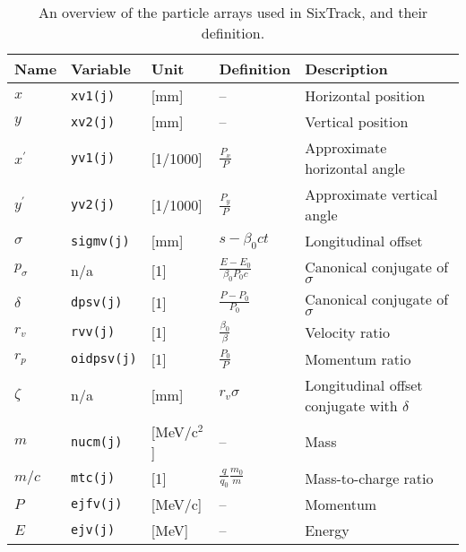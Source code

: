 \begin{center}
\begin{longtabu}{@{}llllp{7cm}}
  \caption{An overview of the particle arrays used in SixTrack, and their definition.}
  \label{Table:TrackArray} \\*
  \textbf{Name} & \textbf{Variable} & \textbf{Unit} & \textbf{Definition} & \textbf{Description} \\
  \hline
  $x$        & \texttt{xv1(j)}    & [mm]         & --                            & Horizontal position \\
  $y$        & \texttt{xv2(j)}    & [mm]         & --                            & Vertical position \\
  $x^\prime$ & \texttt{yv1(j)}    & [1/1000]     & $\frac{P_x}{P}$               & Approximate horizontal angle \\
  $y^\prime$ & \texttt{yv2(j)}    & [1/1000]     & $\frac{P_y}{P}$               & Approximate vertical angle \\
  $\sigma$   & \texttt{sigmv(j)}  & [mm]         & $s-\beta_0 c t$               & Longitudinal offset \\
  $p_\sigma$ & n/a                & [1]          & $\frac{E-E_0}{\beta_0 P_0 c}$ & Canonical conjugate of $\sigma$ \\
  $\delta$   & \texttt{dpsv(j)}   & [1]          & $\frac{P-P_0}{P_0}$           & Canonical conjugate of $\sigma$ \\
  $r_v$      & \texttt{rvv(j)}    & [1]          & $\frac{\beta_0}{\beta}$       & Velocity ratio \\
  $r_p$      & \texttt{oidpsv(j)} & [1]          & $\frac{P_0}{P}$               & Momentum ratio \\
  $\zeta$    & n/a                & [mm]         & $r_v\sigma$                   & Longitudinal offset conjugate with $\delta$ \\
  $m$        & \texttt{nucm(j)}   & [MeV/c$^2$]  & --                            & Mass \\
  $m/c$      & \texttt{mtc(j)}    & [1]          & $\frac{q}{q_0} \frac{m_0}{m}$ & Mass-to-charge ratio \\
  $P$        & \texttt{ejfv(j)}   & [MeV/c]      & --                            & Momentum \\
  $E$        & \texttt{ejv(j)}    & [MeV]        & --                            & Energy \\
\end{longtabu}
\end{center}

